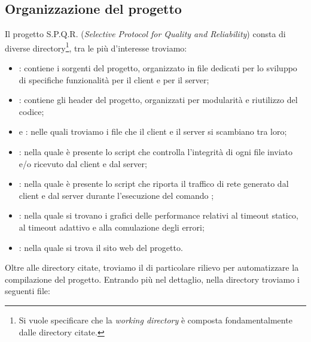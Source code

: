 \subsection{Organizzazione del progetto}
Il progetto S.P.Q.R. (\textit{Selective Protocol for Quality and Reliability}) consta di diverse directory\footnote{Si vuole specificare che la \textit{working directory}  è composta fondamentalmente dalle directory citate.}, tra le più d'interesse troviamo:
\begin{itemize}
    \item {}: contiene i sorgenti del progetto, organizzato in file dedicati per lo sviluppo di specifiche funzionalità per il client e per il server;
    \item {}: contiene gli header del progetto, organizzati per modularità e riutilizzo del codice;
    \item {} e : nelle quali troviamo i file che il client e il server si scambiano tra loro;
    \item {}: nella quale è presente lo script  che controlla l'integrità di ogni file inviato e/o ricevuto dal client e dal server;
    \item {}: nella quale è presente lo script  che riporta il traffico di rete generato dal client e dal server durante l'esecuzione del comando ;
    \item {}: nella quale si trovano i grafici delle performance relativi al timeout statico, al timeout adattivo e alla comulazione degli errori;
    \item {} : nella quale si trova il sito web del progetto.
\end{itemize}
Oltre alle directory citate, troviamo il  di particolare rilievo per automatizzare la compilazione del progetto.
Entrando più nel dettaglio, nella directory  troviamo i seguenti file:
